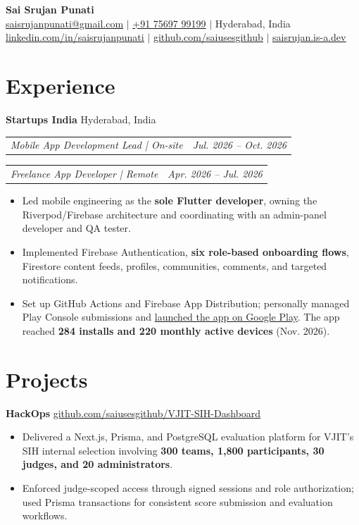 \documentclass[letterpaper,11pt]{article}
\makeatletter
\newcommand{\resumeBulletsStart}{
  \begin{itemize}[
    leftmargin=0.18in,
    label=\textbullet,
    topsep=1pt,
    partopsep=0pt,
    itemsep=1pt,
    parsep=0pt
  ]
}
\newcommand{\resumeBulletsEnd}{\end{itemize}}
\newcommand{\resBullet}[1]{\item\small #1}
\newcommand{\role}[2]{%
  \noindent
  \begin{tabular*}{\linewidth}{@{}l@{\extracolsep{\fill}}r@{}}
    \textit{\small #1} & \textit{\small #2}
  \end{tabular*}
}
\newcommand{\project}[3]{%
  \par\vspace{2pt}
  \noindent
  \textbf{#1}\hfill
  \href{#2}{\underline{\footnotesize #3}}
  \par\vspace{-1pt}
}
\makeatother
\begin{document}
\begin{center}
  {\LARGE\bfseries Sai Srujan Punati}\\[3pt]
  {\small
    \href{mailto:saisrujanpunati@gmail.com}
      {\underline{saisrujanpunati@gmail.com}}
    \quad $|$ \quad
    \href{tel:+917569799199}
      {\underline{+91 75697 99199}}
    \quad $|$ \quad
    Hyderabad, India
  }\\[3pt]
  {\small
    \href{https://linkedin.com/in/saisrujanpunati}
      {\underline{linkedin.com/in/saisrujanpunati}}
    \quad $|$ \quad
    \href{https://github.com/saiusesgithub}
      {\underline{github.com/saiusesgithub}}
    \quad $|$ \quad
    \href{https://saisrujan.is-a.dev}
      {\underline{saisrujan.is-a.dev}}
  }
\end{center}
\vspace{-9pt}

\section{Experience}

\noindent
\textbf{Startups India}
\hfill\small Hyderabad, India\par

\role{Mobile App Development Lead | On-site}
  {Jul. 2026 -- Oct. 2026}
\role{Freelance App Developer | Remote}
  {Apr. 2026 -- Jul. 2026}

\resumeBulletsStart
  \resBullet{Led mobile engineering as the \textbf{sole Flutter developer}, owning the Riverpod/Firebase architecture and coordinating with an admin-panel developer and QA tester.}
  \resBullet{Implemented Firebase Authentication, \textbf{six role-based onboarding flows}, Firestore content feeds, profiles, communities, comments, and targeted notifications.}
  \resBullet{Set up GitHub Actions and Firebase App Distribution; personally managed Play Console submissions and \href{https://play.google.com/store/apps/details?id=in.startupsindia.app}{\underline{launched the app on Google Play}}. The app reached \textbf{284 installs and 220 monthly active devices} (Nov. 2026).}
\resumeBulletsEnd

\section{Projects}

\project{HackOps}
  {https://github.com/saiusesgithub/VJIT-SIH-Dashboard}
  {github.com/saiusesgithub/VJIT-SIH-Dashboard}
\resumeBulletsStart
  \resBullet{Delivered a Next.js, Prisma, and PostgreSQL evaluation platform for VJIT's SIH internal selection involving \textbf{300 teams, 1,800 participants, 30 judges, and 20 administrators}.}
  \resBullet{Enforced judge-scoped access through signed sessions and role authorization; used Prisma transactions for consistent score submission and evaluation workflows.}
\resumeBulletsEnd
\end{document}
